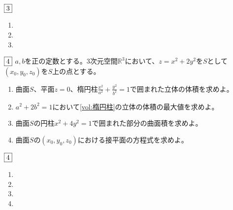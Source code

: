 \documentclass[dvipdfmx]{jsreport}
\newcommand{\R}{\mathbb{R}}
\newcounter{num}[section]
\begin{document}
\begin{answer} %
	$\fbox{3}$
\begin{enumerate}
	\item 
	\item 
	\item 
\end{enumerate}
\end{answer}


\begin{tcolorbox} %
	$\fbox{4}$ $a, b$を正の定数とする。3次元空間$\R^3$において、$z= x^2+ 2y^2$を$S$として$(x_0, y_0, z_0)$を$S$上の点とする。
\begin{enumerate}
	\item\label{vol:楕円柱} 曲面$S$、平面$z= 0$、楕円柱$\frac{x^2}{a^2}+ \frac{y^2}{b^2}= 1$で囲まれた立体の体積を求めよ。
	\item $a^2 +2b^2= 1$において\ref{vol:楕円柱}の立体の体積の最大値を求めよ。
	\item 曲面$S$の円柱$x^2+ 4y^2= 1$で囲まれた部分の曲面積を求めよ。
	\item 曲面$S$の$(x_0, y_0, z_0)$における接平面の方程式を求めよ。
\end{enumerate}
\end{tcolorbox}

\begin{answer} %
	$\fbox{4}$
\begin{enumerate}
	\item 
	\item 
	\item 
	\item 
\end{enumerate}
\end{answer}
\end{document}

